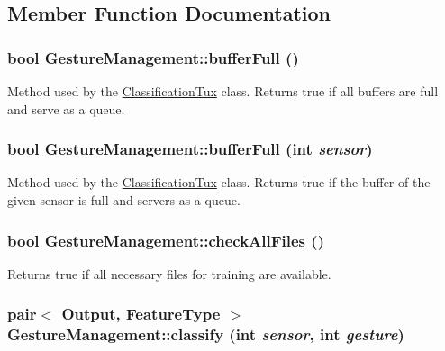 \subsection{Member Function Documentation}
\hypertarget{classGestureManagement_a36208ebdd11b74bb7cd4a15cab22af48}{
\subsubsection[{bufferFull}]{\setlength{\rightskip}{0pt plus 5cm}bool GestureManagement::bufferFull ()}}
\label{classGestureManagement_a36208ebdd11b74bb7cd4a15cab22af48}
Method used by the \hyperlink{classClassificationTux}{ClassificationTux} class. Returns true if all buffers are full and serve as a queue. \hypertarget{classGestureManagement_afad51301bfe33276f8f04e826aa61d41}{
\subsubsection[{bufferFull}]{\setlength{\rightskip}{0pt plus 5cm}bool GestureManagement::bufferFull (int {\em sensor})}}
\label{classGestureManagement_afad51301bfe33276f8f04e826aa61d41}
Method used by the \hyperlink{classClassificationTux}{ClassificationTux} class. Returns true if the buffer of the given sensor is full and servers as a queue. \hypertarget{classGestureManagement_a7c776e3376dff513610ba4bf82cae796}{
\subsubsection[{checkAllFiles}]{\setlength{\rightskip}{0pt plus 5cm}bool GestureManagement::checkAllFiles ()}}
\label{classGestureManagement_a7c776e3376dff513610ba4bf82cae796}
Returns true if all necessary files for training are available. \hypertarget{classGestureManagement_a640061cf24cb6663bb6a9660cb53ad18}{
\subsubsection[{classify}]{\setlength{\rightskip}{0pt plus 5cm}pair$<$ {\bf Output}, FeatureType $>$ GestureManagement::classify (int {\em sensor}, \/  int {\em gesture})}}
